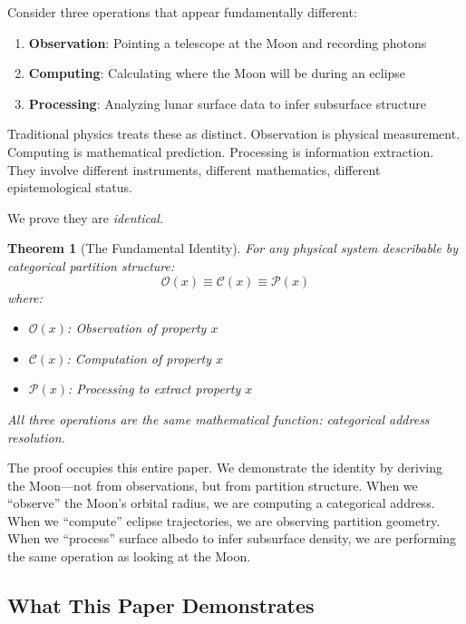 \documentclass[12pt,a4paper]{article}
\newtheorem{theorem}{Theorem}[section]
\theoremstyle{definition}
\theoremstyle{remark}
\newcommand{\Obs}{\mathcal{O}}
\newcommand{\Comp}{\mathcal{C}}
\newcommand{\Proc}{\mathcal{P}}
\begin{document}
Consider three operations that appear fundamentally different:

\begin{enumerate}
    \item \textbf{Observation}: Pointing a telescope at the Moon and recording photons
    \item \textbf{Computing}: Calculating where the Moon will be during an eclipse
    \item \textbf{Processing}: Analyzing lunar surface data to infer subsurface structure
\end{enumerate}

Traditional physics treats these as distinct. Observation is physical measurement. Computing is mathematical prediction. Processing is information extraction. They involve different instruments, different mathematics, different epistemological status.

We prove they are \emph{identical}.

\begin{theorem}[The Fundamental Identity]
\label{thm:fundamental}
For any physical system describable by categorical partition structure:
\begin{equation}
\boxed{\Obs(x) \equiv \Comp(x) \equiv \Proc(x)}
\end{equation}
where:
\begin{itemize}
    \item $\Obs(x)$: Observation of property $x$
    \item $\Comp(x)$: Computation of property $x$
    \item $\Proc(x)$: Processing to extract property $x$
\end{itemize}
All three operations are the same mathematical function: categorical address resolution.
\end{theorem}

The proof occupies this entire paper. We demonstrate the identity by deriving the Moon---not from observations, but from partition structure. When we ``observe'' the Moon's orbital radius, we are computing a categorical address. When we ``compute'' eclipse trajectories, we are observing partition geometry. When we ``process'' surface albedo to infer subsurface density, we are performing the same operation as looking at the Moon.

\subsection{What This Paper Demonstrates}
\end{document}
